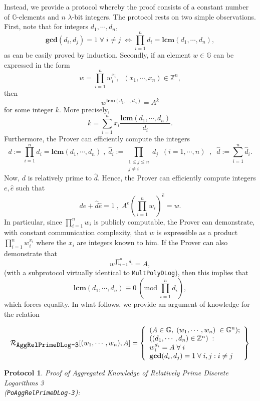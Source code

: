 \documentclass[11pt, lettersize, notitlepage, leqno, footskip=0.6cm]{article}
\newcommand{\bz}{\mathbb Z}
\newcommand{\pl}{\prod\limits}
\newcommand{\slim}{\sum\limits}
\newcommand{\LRA}{\Longleftrightarrow}
\newcommand{\mc}{\mathcal}
\newcommand{\mb}{\mathbb}
\newcommand{\mbf}{\mathbf}
\newcommand{\lam}{\lambda}
\newcommand{\what}{\widehat}
\newcommand{\vs}{\vspace{-0.15cm}}
\newcommand{\Mod}[1]{\ (\mathrm{mod}\ #1)}
\newcommand{\LCM}{\mbf{lcm}}
\newcommand{\GCD}{\mbf{gcd}}
\newtheorem{Prot}[Thm]{Protocol}
\numberwithin{equation}{section}
\begin{document}
Instead, we provide a protocol whereby the proof consists of a constant number of $\mb{G}$-elements and $n$ $\lam$-bit integers. The protocol rests on two simple observations. First, note that for integers $d_1,\cdots,d_n$, \vs $$\GCD(d_i,d_j)=1\;\forall\;i\neq j\; \LRA \pl_{i=1}^n d_i= \LCM(d_1,\cdots,d_n),$$ as can be easily proved by induction. Secondly, if an element $w\in \mb{G}$ can be expressed in the form \vspace{-0.15cm}$$w = \prod\limits_{i=1}^n w_i^{x_i},\;\;(x_1,\cdots,x_n)\in\bz^n,$$ then \vs $$w^{\LCM(d_1,\cdots,d_n)} = A^{k} $$ for some integer $k$. More precisely, \vs $$k = \slim_{i=1}^n x_i\frac{\LCM(d_1,\cdots,d_n)}{d_i}.$$ Furthermore, the Prover can efficiently compute the integers \vs $$d:= \pl_{i=1}^n d_i = \LCM(d_1,\cdots,d_n)\;,\;\what{d}_i:= \pl_{\substack{1\leq j\leq n\\ j\neq i}} d_j\;\; (i=1,\cdots,n)\;\;,\;\; \what{d} := \slim_{i=1}^n \what{d}_i.$$ Now, $d$ is relatively prime to $\what{d}$. Hence, the Prover can efficiently compute integers $e,\what{e}$ such that $$de+\what{d}\what{e} = 1\;,\; A^e(\pl_{i=1}^n w_i)^{\what{e}} = w.  $$ In particular, since $\pl_{i=1}^n w_i$ is publicly computable, the Prover can demonstrate, with constant communication complexity, that $w$ is expressible as a product $\pl_{i=1}^n w_i^{x_i}$ where the $x_i$ are integers known to him. If the Prover can also demonstrate that $$w^{\prod\limits_{i=1}^n d_i} = A,$$ (with a subprotocol virtually identical to \verb|MultPolyDLog|), then this implies that \vspace{-0.15cm}$$\LCM(d_1,\cdots,d_n)\equiv 0\Mod{ \prod\limits_{i=1}^n d_i},$$ which forces equality. In what follows, we provide an argument of knowledge for the relation 

\[
  \mc{R}_{{\protect\verb|AggRelPrimeDLog-3|}}[(w_1,\cdots, w_n), A] = \left\{\begin{array}{l}
    (A\in\mb{G},\; (w_1,\cdots, w_n)\;\in\mb{G}^n);\\
    ((d_1,\cdots,d_n)\in\bz^n)\;: \\
    w_i^{d_i} = A\;\forall\;i\\
   	\GCD(d_i, d_j) = 1\;\forall \;i,j: i\neq j
  \end{array}\right\}
\] 

\vspace{0.2cm}



\begin{Prot} \normalfont \textit{Proof of Aggregated Knowledge of Relatively Prime Discrete Logarithms} 3\\ (\verb|PoAggRelPrimeDLog-3|):\end{Prot} \vspace{-0.3cm}
\end{document}
